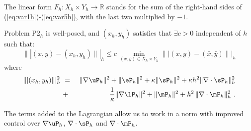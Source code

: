 The linear form $F_h:X_h\times Y_h \to \mathbb{R}$ stands for the sum of the right-hand sides of (\ref{eq:var1h})-(\ref{eq:var5h}), with the last two multiplied by $-1$.

\begin{theorem}
	Problem P2$_h$ is well-posed, and $(x_h,y_h)$ satisfies that $\exists c>0$ independent of $h$ such that:
	\begin{equation}
		\||(x,y)-(x_h,y_h)\||_h \leq c\,\min_{(\bar{x},\bar{y})\in X_h\times Y_h}
		\||(x,y)-(\bar{x},\bar{y})\||_h
		\label{eq:bestapprox}
	\end{equation}
	where
	\begin{eqnarray}
		\||(x_h,y_h)\||_h^2 ~&=&~ \|\nabla \uP_h \|^2 +\|\eP_h\|^2 + \kappa \|\sP_h\|^2 + \kappa h^2 \|\nabla \cdot \sP_h\|_h^2 \nonumber \\
		~&+&~ \frac{1}{\kappa} \|\nabla \lP_h\|^2 + \|\mP_h\|^2 + h^2\,\|\nabla \cdot \mP_h\|^2_h~.
	\end{eqnarray}
\end{theorem}

The terms added to the Lagrangian allow us to work in a norm with improved control over $\nabla \uP_h$, $\nabla \cdot \sP_h$ and $\nabla \cdot \mP_h$.


